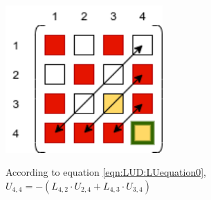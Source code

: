 \begin{minipage}{0.45\textwidth}
\includegraphics[width=0.45\textwidth]{./Scheduler/PpT-Symbolic_A33.png}
\end{minipage}%
\hfill
\begin{minipage}{0.85\textwidth}
According to equation \ref{eqn:LUD:LUequation0},\\
$U_{4,4}= - (L_{4,2}\cdot U_{2,4} + L_{4,3}\cdot U_{3,4})$
\end{minipage}